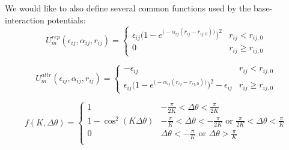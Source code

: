 We would like to also define several common functions used by the
base-interaction potentials:
\begin{equation}
  \label{eq:dna_3spn2c_nonlocal_base_rep}
  U_m^{rep}(\epsilon_{ij}, \alpha_{ij}, r_{ij}) =
  \begin{cases}
    \epsilon_{ij} \Big( 1-e^{\big(-\alpha_{ij}(r_{ij}-r_{ij,0})\big)} \Big)^2 & r_{ij} < r_{ij, 0} \\[.5em]
    0 & r_{ij} \ge r_{ij, 0}
  \end{cases}
\end{equation}

\begin{equation}
  \label{eq:dna_3spn2c_nonlocal_base_attr}
  U_m^{attr}(\epsilon_{ij}, \alpha_{ij}, r_{ij}) =
  \begin{cases}
    -\epsilon_{ij} & r_{ij} < r_{ij, 0} \\[.5em]
    \epsilon_{ij} \Big(1-e^{\big(-\alpha_{ij}(r_{ij}-r_{ij,0})\big)} \Big)^2 - \epsilon_{ij} & r_{ij} \ge r_{ij, 0}
  \end{cases}
\end{equation}

\begin{equation}
  \label{eq:dna_3spn2c_nonlocal_base_angle_mod}
  f(K, \Delta \theta) =
  \begin{cases}
    1 & \displaystyle -\frac{\pi}{2K} < \Delta \theta < \frac{\pi}{2K} \\[.7em]
    1 - \cos^2(K\Delta\theta) & \displaystyle -\frac{\pi}{K} < \Delta \theta < -\frac{\pi}{2K} \textrm{ or } \frac{\pi}{2K} < \Delta \theta < \frac{\pi}{K} \\[.7em]
    0 & \displaystyle \Delta \theta < -\frac{\pi}{K} \textrm{ or }  \Delta \theta > \frac{\pi}{K} \\
  \end{cases}
\end{equation}
